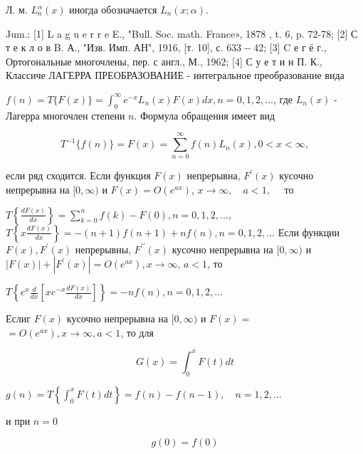 \documentclass[10pt]{article}
\begin{document}
Л. м. $L_{n}^{\alpha}(x)$ иногда обозначается $L_{n}(x ; \alpha)$.



Jum.: [1] L a g u e r r e E., "Bull. Soc. math. France», 1878 , t. 6, p. 72-78; [2] С т е к л о в B. А., "Изв. Имп. АН", 1916, [т. 10], с. $633-42$; [3] C е г ё г., Ортогональные многочлены, пер. с англ., М., 1962; [4] С у е т и н П. К., Классиче ЛАГЕРРА ПРЕОБРАЗОВАНИЕ - интегральное преобразование вида



$f(n)=T\{F(x)\}=\int_{0}^{\infty} e^{-x} L_{n}(x) F(x) d x, n=0,1,2, \ldots$, где $L_{n}(x)$ - Лагерра многочлен степени $n$. Формула обращения имеет вид



\[

T^{-1}\{f(n)\}=F(x)=\sum_{n=0}^{\infty} f(n) L_{n}(x), 0<x<\infty,

\]



если ряд сходится. Если функция $F(x)$ непрерывна, $F^{\prime}(x)$ кусочно непрерывна на $[0, \infty)$ и $F(x)=O\left(e^{a x}\right)$, $x \rightarrow \infty, \quad a<1, \quad$ то



$T\left\{\frac{d F(x)}{d x}\right\}=\sum_{k=0}^{n} f(k)-F(0), n=0,1,2, \ldots$, $T\left\{x \frac{d F(x)}{d x}\right\}=-(n+1) f(n+1)+n f(n), n=0,1,2, \ldots$ Если функции $F(x), F^{\prime}(x)$ непрерывны, $F^{\prime \prime}(x)$ кусочно непрерывна на $[0, \infty)$ и $|F(x)|+\left|F^{\prime}(x)\right|=O\left(e^{a x}\right), x \rightarrow \infty$, $a<1$, то



$T\left\{e^{x} \frac{d}{d x}\left[x e^{-x} \frac{d F(x)}{d x}\right]\right\}=-n f(n), n=0,1,2, \ldots$



Еслиг $F(x)$ кусочно непрерывна на $[0, \infty)$ и $F(x)=$ $=O\left(e^{a x}\right), x \rightarrow \infty, a<1$, то для



\[

G(x)=\int_{0}^{x} F(t) d t

\]



$g(n)=T\left\{\int_{0}^{x} F(t) d t\right\}=f(n)-f(n-1), \quad n=1,2, \ldots$



и при $n=0$



\[

g(0)=f(0)

\]
\end{document}
